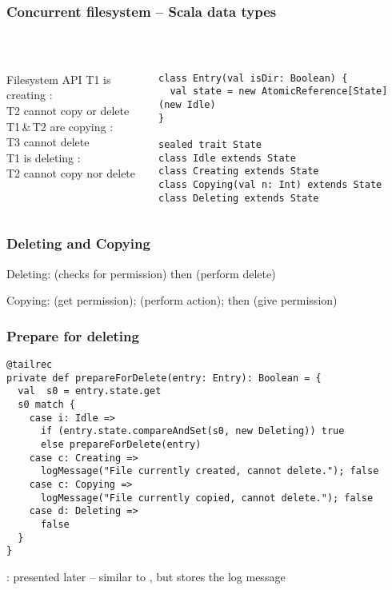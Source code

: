 \documentclass[aspectratio=169]{beamer}
\begin{document}
\begin{frame}[fragile]\frametitle{Concurrent filesystem -- Scala data types}
~\\[-8mm]
\begin{columns}
\begin{column}{0.35\textwidth}
    \begin{block}{Filesystem API}
      \alert{T1} is creating :
      \\\alert{T2} cannot copy or delete 
      \\[4mm]\alert{T1}\,\&\,\alert{T2} are copying :
      \\\alert{T3} cannot delete 
      \\[4mm]\alert{T1} is deleting :
      \\\alert{T2} cannot copy nor delete 
    \end{block}
\end{column}
\begin{column}{0.68\textwidth}
\begin{lstlisting}[emph={execute,sleep,log,compareAndSet,State,AtomicReference}]
class Entry(val isDir: Boolean) {
  val state = new AtomicReference[State](new Idle)
}

sealed trait State
class Idle extends State
class Creating extends State
class Copying(val n: Int) extends State
class Deleting extends State
\end{lstlisting}
\end{column}
\end{columns}
\end{frame}


\begin{frame}[fragile]\frametitle{Deleting and Copying}
\alert{Deleting:} \textbf{} (checks for permission) then  (perform delete)

\alert{Copying:}  (get permission);  (perform action); then  (give permission)
\end{frame}


\begin{frame}[fragile]\frametitle{Prepare for deleting}

\begin{lstlisting}[emph={execute,sleep,log,logMessage,compareAndSet,State,AtomicReference}]
@tailrec
private def prepareForDelete(entry: Entry): Boolean = {
  val  s0 = entry.state.get
  s0 match {
    case i: Idle =>
      if (entry.state.compareAndSet(s0, new Deleting)) true
      else prepareForDelete(entry)
    case c: Creating =>
      logMessage("File currently created, cannot delete."); false
    case c: Copying =>
      logMessage("File currently copied, cannot delete."); false
    case d: Deleting =>
      false
  }
}
\end{lstlisting}

: presented later -- similar to , but stores the log message
\end{frame}
\end{document}
